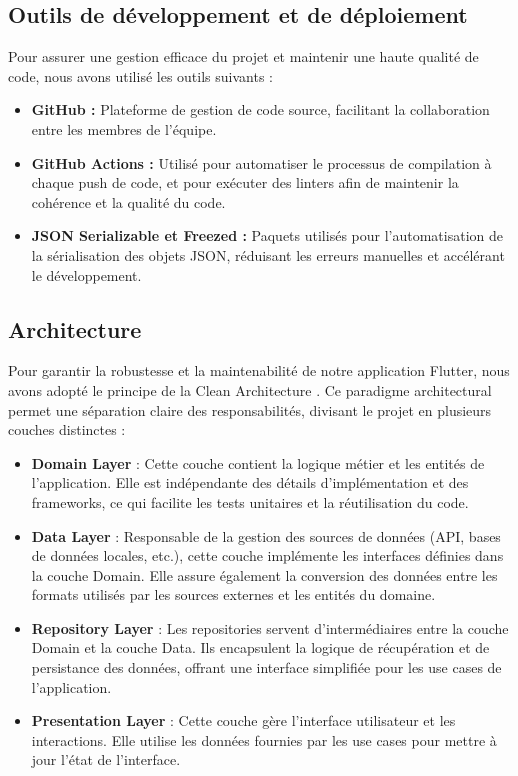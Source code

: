 \subsection{Outils de développement et de déploiement}

Pour assurer une gestion efficace du projet et maintenir une haute qualité de code, nous avons utilisé les outils suivants :

\begin{itemize}[noitemsep]
    \item \textbf{GitHub :} Plateforme de gestion de code source, facilitant la collaboration entre les membres de l'équipe.
    \item \textbf{GitHub Actions :} Utilisé pour automatiser le processus de compilation à chaque push de code, et pour exécuter des linters afin de maintenir la cohérence et la qualité du code.
    \item \textbf{JSON Serializable et Freezed :} Paquets utilisés pour l'automatisation de la sérialisation des objets JSON, réduisant les erreurs manuelles et accélérant le développement.
\end{itemize}

\subsection{Architecture}
\label{sec:architecture}

Pour garantir la robustesse et la maintenabilité de notre application Flutter, nous avons adopté le principe de la Clean Architecture \cite{cleanArchitecture}. Ce paradigme architectural permet une séparation claire des responsabilités, divisant le projet en plusieurs couches distinctes :

\begin{itemize}[noitemsep]
    \item \textbf{Domain Layer} : Cette couche contient la logique métier et les entités de l'application. Elle est indépendante des détails d'implémentation et des frameworks, ce qui facilite les tests unitaires et la réutilisation du code.
    \item \textbf{Data Layer} : Responsable de la gestion des sources de données (API, bases de données locales, etc.), cette couche implémente les interfaces définies dans la couche Domain. Elle assure également la conversion des données entre les formats utilisés par les sources externes et les entités du domaine.
    \item \textbf{Repository Layer} : Les repositories servent d'intermédiaires entre la couche Domain et la couche Data. Ils encapsulent la logique de récupération et de persistance des données, offrant une interface simplifiée pour les use cases de l'application.
    \item \textbf{Presentation Layer} : Cette couche gère l'interface utilisateur et les interactions. Elle utilise les données fournies par les use cases pour mettre à jour l'état de l'interface.
\end{itemize}

